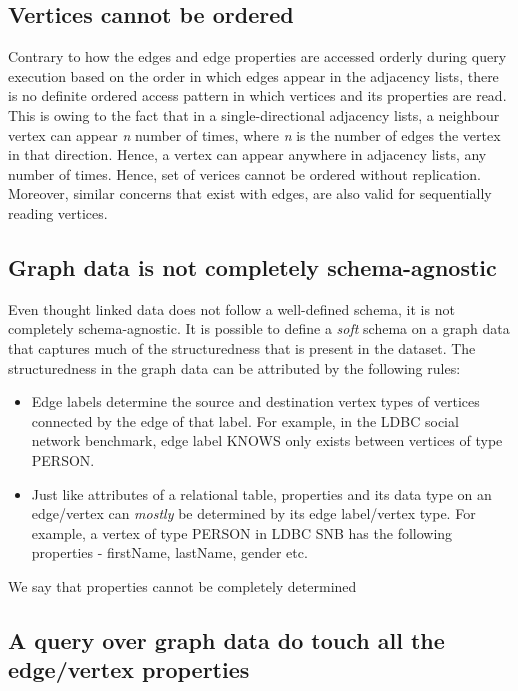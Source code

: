 \subsection{Vertices cannot be ordered}

Contrary to how the edges and edge properties are accessed orderly during query execution based on the order in which edges appear in the adjacency lists, there is no definite ordered access pattern in which vertices and its properties are read. This is owing to the fact that in a single-directional adjacency lists, a neighbour vertex can appear \textit{n} number of times, where \textit{n} is the number of edges the vertex in that direction. Hence, a vertex can appear anywhere in adjacency lists, any number of times. Hence, set of verices cannot be ordered without replication. Moreover, similar concerns that exist with edges, are also valid for sequentially reading vertices.

\subsection{Graph data is not completely schema-agnostic}

Even thought linked data does not follow a well-defined schema, it is not completely schema-agnostic. It is possible to define a \emph{soft} schema on a graph data that captures much of the structuredness that is present in the dataset. The structuredness in the graph data can be attributed by the following rules:
\begin{itemize}
	\item Edge labels determine the source and destination vertex types of vertices connected by the edge of that label. For example, in the LDBC social network benchmark, edge label KNOWS only exists between vertices of type PERSON.
	\item Just like attributes of a relational table, properties and its data type on an edge/vertex can \emph{mostly} be determined by its edge label/vertex type. For example, a vertex of type PERSON in LDBC SNB has the following properties - firstName, lastName, gender etc. 
\end{itemize}

We say that properties cannot be completely determined 

\subsection{A query over graph data do touch all the edge/vertex properties}







